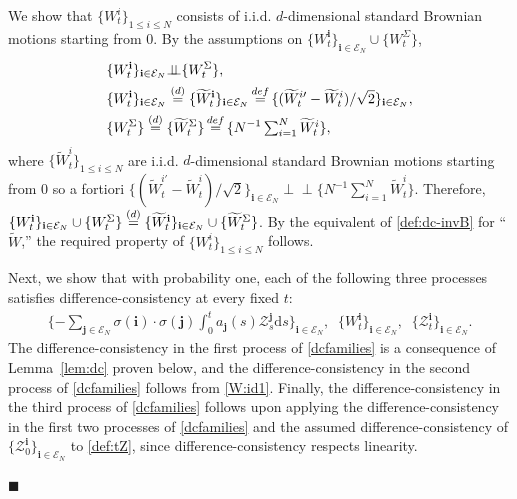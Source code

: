 \documentclass[12pt, twoside]{article}
\numberwithin{figure}{section}
\newcommand{\1}{\mathds 1}
\newcommand{\ind}{{\perp\!\!\!\perp}}
\newcommand{\mc}{\mathcal}
\renewcommand{\d}{{\mathrm d}}
\newcommand{\2}{{\mathbf 1}}
\newcommand{\defeq}{{\stackrel{\rm def}{=}}}
\renewenvironment{proof}[1][\proofname]{\noindent {\bfseries #1.}\;}{\hfill\ensuremath{\blacksquare}\\}
\newcommand{\cc}{{^\circ}}
\newcommand{\bi}{\mathbf i}
\newcommand{\bj}{\mathbf j}
\newcommand{\two}{{\sqrt{2}}}
\newcommand{\wt}{\widetilde}
\begin{document}
\begin{proof}[Proof of Proposition~\ref{prop:RM} (2$\cc$)]
 We show that $\{W^i_t \}_{1\leq i\leq N}$ consists of i.i.d. $d$-dimensional standard Brownian motions starting from $0$. By the assumptions on $\{W^\bi_t\}_{\bi\in \mc E_N}\cup \{W^\Sigma_t\}$,
\begin{align}
&\{W^\bi_t\}_{\bi\in \mc E_N}\ind \{W^\Sigma_t\},\\
&\{W^\bi_t \}_{\bi\in \mc E_N}\stackrel{\rm (d)}{=}\{\wt{W}^\bi_t\}_{\bi\in \mc E_N}\,\defeq\,\{(\wt{W}^{i\prime}_t-\wt{W}^i_t)/\two \}_{\bi\in \mc E_N},\label{W:id1}\\
&\{W_t^\Sigma\}\stackrel{\rm (d)}{=}\{\wt{W}^\Sigma_t\}\,\defeq\,\{N^{-1}\textstyle \sum_{i=1}^N\wt{W}^i_t\},
\end{align}
where $\{\wt{W}^i_t \}_{1\leq i\leq N}$ are i.i.d. $d$-dimensional standard Brownian motions starting from $0$ so a fortiori $\{(\wt{W}^{i\prime}_t-\wt{W}^i_t)/\two \}_{ \bi\in \mc E_N}\ind \{N^{-1}\textstyle \sum_{i=1}^N\wt{W}^i_t \}$.  Therefore,
$\{W^\bi_t\}_{\bi\in \mc E_N}\cup \{W^\Sigma_t\}\stackrel{\rm (d)}{=}\{\wt{W}^\bi_t\}_{\bi\in \mc E_N}\cup \{\wt{W}^\Sigma_t\}$.
By the equivalent of \eqref{def:dc-invB} for ``$\wt{W}$,'' the required property of $\{W^i_t\}_{1\leq i\leq N}$ follows. \medskip 
 \medskip 

Next, we show that with probability one, each of the following three processes satisfies difference-consistency at every fixed $t$:
\begin{align}\label{dcfamilies}
\textstyle \{-\sum_{\bj\in \mc E_N}\sigma(\bi)\cdot \sigma(\bj)\int_0^t a_\bj(s)\mc Z^\bj_s\d s\}_{\bi\in \mc E_N},\;\; \{W^\bi_t\}_{\bi\in \mc E_N},\;\; \{\mc Z^\bi_t\}_{\bi\in \mc E_N}.
\end{align}
The difference-consistency in the first process of \eqref{dcfamilies} is a consequence of Lemma~\ref{lem:dc} proven below, and the difference-consistency in the second process of \eqref{dcfamilies} follows from \eqref{W:id1}. Finally, the difference-consistency in the third process of \eqref{dcfamilies} follows upon applying the difference-consistency in the first two processes of \eqref{dcfamilies} and the assumed difference-consistency of $\{\mc Z^\bi_0\}_{\bi\in \mc E_N}$ to  \eqref{def:tZ}, since difference-consistency respects linearity. 
\medskip 


\end{proof}
\end{document}
